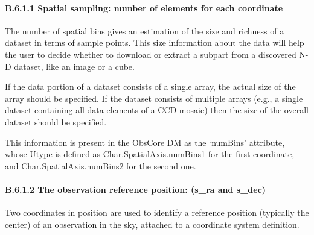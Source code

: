 \documentclass[11pt,a4paper]{ivoa}
\begin{document}
\paragraph{B.6.1.1 Spatial sampling: number of elements for each coordinate}
The number of spatial bins gives an estimation of the size and richness of a dataset in terms of sample points. This
size information about the data will help the user to decide whether to download or extract a subpart from a discovered
N-D dataset, like an image or a cube.

If the data portion of a dataset consists of a single array, the actual size of the array should be specified.  If the
dataset consists of multiple arrays (e.g., a single dataset containing all data elements of a CCD mosaic) then the size
of the overall dataset should be specified.

This information is present in the ObsCore DM as the `numBins' attribute, whose Utype is defined as
Char.SpatialAxis.numBins1 for the first coordinate, and Char.SpatialAxis.numBins2 for the second one.

\paragraph{B.6.1.2 The observation reference position: (s\_ra and s\_dec)}
Two coordinates in position are used to identify a reference position (typically the center) of an observation in the
sky, attached to a coordinate system definition.
\end{document}
